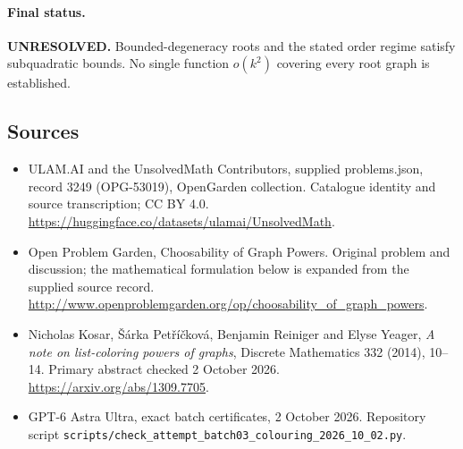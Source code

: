 \documentclass[11pt,a4paper]{article}
\begin{document}
\paragraph{Final status.}
\textbf{UNRESOLVED.} Bounded-degeneracy roots and the stated order
regime satisfy subquadratic bounds. No single function $o(k^2)$
covering every root graph is established.

\subsection{Sources}
\begin{itemize}
\item[S1] ULAM.AI and the UnsolvedMath Contributors, supplied problems.json, record 3249 (OPG-53019), OpenGarden collection. Catalogue identity and source transcription; CC BY 4.0.
\url{https://huggingface.co/datasets/ulamai/UnsolvedMath}.
\item[S2] Open Problem Garden, Choosability of Graph Powers. Original problem and discussion; the mathematical formulation below is expanded from the supplied source record.
\url{http://www.openproblemgarden.org/op/choosability_of_graph_powers}.

\item[R1] Nicholas Kosar, \v S\'arka Pet\v r\'i\v ckov\'a,
Benjamin Reiniger and Elyse Yeager, \emph{A note on list-coloring powers
of graphs}, Discrete Mathematics 332 (2014), 10--14. Primary abstract
checked 2 October 2026.
\url{https://arxiv.org/abs/1309.7705}.
\item[R2] GPT-6 Astra Ultra, exact batch certificates, 2 October 2026.
Repository script \texttt{scripts/check\_attempt\_batch03\_colouring\_2026\_10\_02.py}.

\end{itemize}
\end{document}
